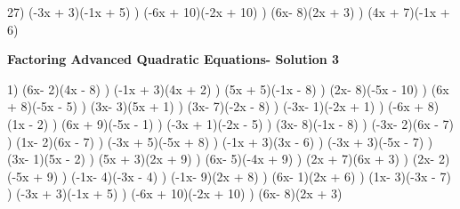 \documentclass{article}%
\begin{document}
27) (-3x + 3)(-1x + 5)%
) (-6x + 10)(-2x + 10)%
) (6x- 8)(2x + 3)%
) (4x + 7)(-1x + 6)%
\newline%
\newpage%
\large%
\begin{center}%
\textbf{Factoring Advanced Quadratic Equations- Solution 3}%
\newline%
\end{center} \normalsize%
1) (6x- 2)(4x - 8)%
) (-1x + 3)(4x + 2)%
) (5x + 5)(-1x - 8)%
) (2x- 8)(-5x - 10)%
) (6x + 8)(-5x - 5)%
) (3x- 3)(5x + 1)%
) (3x- 7)(-2x - 8)%
) (-3x- 1)(-2x + 1)%
) (-6x + 8)(1x - 2)%
) (6x + 9)(-5x - 1)%
) (-3x + 1)(-2x - 5)%
) (3x- 8)(-1x - 8)%
) (-3x- 2)(6x - 7)%
) (1x- 2)(6x - 7)%
) (-3x + 5)(-5x + 8)%
) (-1x + 3)(3x - 6)%
) (-3x + 3)(-5x - 7)%
) (3x- 1)(5x - 2)%
) (5x + 3)(2x + 9)%
) (6x- 5)(-4x + 9)%
) (2x + 7)(6x + 3)%
) (2x- 2)(-5x + 9)%
) (-1x- 4)(-3x - 4)%
) (-1x- 9)(2x + 8)%
) (6x- 1)(2x + 6)%
) (1x- 3)(-3x - 7)%
) (-3x + 3)(-1x + 5)%
) (-6x + 10)(-2x + 10)%
) (6x- 8)(2x + 3)%
\newline%
\end{document}
